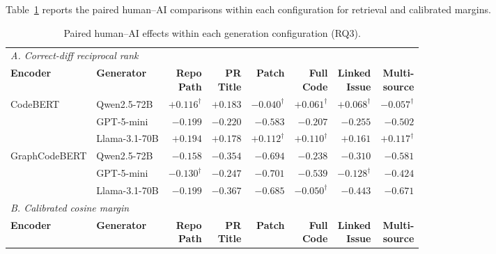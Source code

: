 \documentclass[11pt,a4paper]{article}
\begin{document}
Table~\ref{tab:rq3_context_effects} reports the paired human--AI comparisons within each configuration for retrieval and calibrated margins.

\begin{table}[htbp]
\centering
\caption{Paired human--AI effects within each generation configuration (RQ3).}
\label{tab:rq3_context_effects}
\footnotesize
\setlength{\tabcolsep}{3pt}
\renewcommand{\arraystretch}{1.12}
\begin{tabular}{@{}llrrrrrr@{}}
\toprule
\multicolumn{8}{l}{\textit{A. Correct-diff reciprocal rank}} \\
\textbf{Encoder} & \textbf{Generator} & \shortstack{\textbf{Repo}\\\textbf{Path}} & \shortstack{\textbf{PR}\\\textbf{Title}} & \textbf{Patch} & \shortstack{\textbf{Full}\\\textbf{Code}} & \shortstack{\textbf{Linked}\\\textbf{Issue}} & \shortstack{\textbf{Multi-}\\\textbf{source}} \\
\midrule
CodeBERT & Qwen2.5-72B & $+0.116^{\dagger}$ & $+0.183$ & $-0.040^{\dagger}$ & $+0.061^{\dagger}$ & $+0.068^{\dagger}$ & $-0.057^{\dagger}$ \\
 & GPT-5-mini & $-0.199$ & $-0.220$ & $-0.583$ & $-0.207$ & $-0.255$ & $-0.502$ \\
 & Llama-3.1-70B & $+0.194$ & $+0.178$ & $+0.112^{\dagger}$ & $+0.110^{\dagger}$ & $+0.161$ & $+0.117^{\dagger}$ \\
\addlinespace[3pt]
GraphCodeBERT & Qwen2.5-72B & $-0.158$ & $-0.354$ & $-0.694$ & $-0.238$ & $-0.310$ & $-0.581$ \\
 & GPT-5-mini & $-0.130^{\dagger}$ & $-0.247$ & $-0.701$ & $-0.539$ & $-0.128^{\dagger}$ & $-0.424$ \\
 & Llama-3.1-70B & $-0.199$ & $-0.367$ & $-0.685$ & $-0.050^{\dagger}$ & $-0.443$ & $-0.671$ \\
\midrule
\multicolumn{8}{l}{\textit{B. Calibrated cosine margin}} \\
\textbf{Encoder} & \textbf{Generator} & \shortstack{\textbf{Repo}\\\textbf{Path}} & \shortstack{\textbf{PR}\\\textbf{Title}} & \textbf{Patch} & \shortstack{\textbf{Full}\\\textbf{Code}} & \shortstack{\textbf{Linked}\\\textbf{Issue}} & \shortstack{\textbf{Multi-}\\\textbf{source}} \\

\end{tabular}
\end{table}
\end{document}
